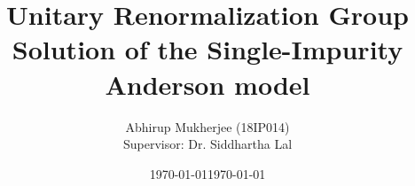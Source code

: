 \documentclass[aspectratio=169]{beamer}
\title{Unitary Renormalization Group Solution of the Single-Impurity Anderson model}
\subtitle{}
\date{\today}
\author{Abhirup Mukherjee (18IP014)\\[5mm]{Supervisor: Dr. Siddhartha Lal}}
\institute{IISER Kolkata}
\date{\today}
\begin{document}
\begin{frame}
\maketitle
\end{frame}



\end{document}
